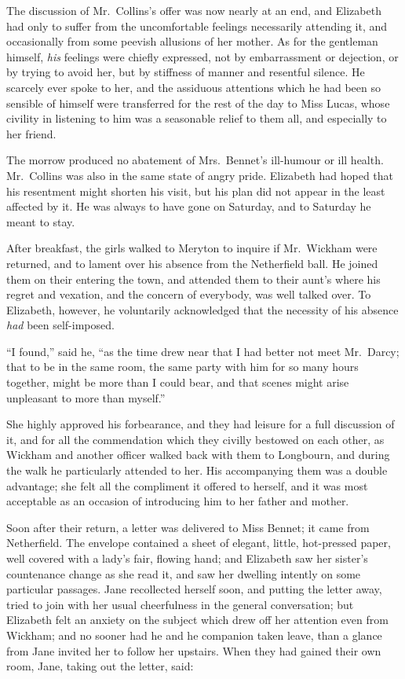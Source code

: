 \documentclass[12pt,english]{book}
\begin{document}


The discussion of Mr.\ Collins's offer was now nearly at an end,
and Elizabeth had only to suffer from the uncomfortable feelings necessarily
attending it, and occasionally from some peevish allusions of her
mother. As for the gentleman himself, \textit{his} feelings were chiefly
expressed, not by embarrassment or dejection, or by trying to avoid
her, but by stiffness of manner and resentful silence. He scarcely
ever spoke to her, and the assiduous attentions which he had been
so sensible of himself were transferred for the rest of the day to
Miss Lucas, whose civility in listening to him was a seasonable relief
to them all, and especially to her friend.

The morrow produced no abatement of Mrs.\ Bennet's ill-humour or
ill health. Mr.\ Collins was also in the same state of angry pride.
Elizabeth had hoped that his resentment might shorten his visit, but
his plan did not appear in the least affected by it. He was always
to have gone on Saturday, and to Saturday he meant to stay.

After breakfast, the girls walked to Meryton to inquire if Mr.\ Wickham
were returned, and to lament over his absence from the Netherfield
ball. He joined them on their entering the town, and attended them
to their aunt's where his regret and vexation, and the concern of
everybody, was well talked over. To Elizabeth, however, he voluntarily
acknowledged that the necessity of his absence \textit{had} been self-imposed.

{}``I found,'' said he, {}``as the time drew near that I had better
not meet Mr.\ Darcy; that to be in the same room, the same party
with him for so many hours together, might be more than I could bear,
and that scenes might arise unpleasant to more than myself.''

She highly approved his forbearance, and they had leisure for a full
discussion of it, and for all the commendation which they civilly
bestowed on each other, as Wickham and another officer walked back
with them to Longbourn, and during the walk he particularly attended
to her. His accompanying them was a double advantage; she felt all
the compliment it offered to herself, and it was most acceptable as
an occasion of introducing him to her father and mother.

Soon after their return, a letter was delivered to Miss Bennet; it
came from Netherfield. The envelope contained a sheet of elegant,
little, hot-pressed paper, well covered with a lady's fair, flowing
hand; and Elizabeth saw her sister's countenance change as she read
it, and saw her dwelling intently on some particular passages. Jane
recollected herself soon, and putting the letter away, tried to join
with her usual cheerfulness in the general conversation; but Elizabeth
felt an anxiety on the subject which drew off her attention even from
Wickham; and no sooner had he and he companion taken leave, than a
glance from Jane invited her to follow her upstairs. When they had
gained their own room, Jane, taking out the letter, said:
\end{document}
